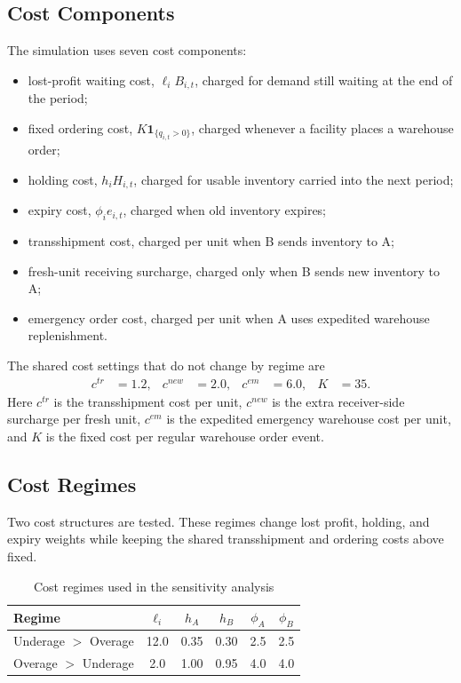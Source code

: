 \documentclass[11pt]{article}
\begin{document}
\subsection{Cost Components}
The simulation uses seven cost components:
\begin{itemize}[leftmargin=2em]
\item lost-profit waiting cost, $\ell_i B_{i,t}$, charged for demand still waiting at the end of the period;
\item fixed ordering cost, $K \mathbf{1}_{\{q_{i,t}>0\}}$, charged whenever a facility places a warehouse order;
\item holding cost, $h_i H_{i,t}$, charged for usable inventory carried into the next period;
\item expiry cost, $\phi_i e_{i,t}$, charged when old inventory expires;
\item transshipment cost, charged per unit when B sends inventory to A;
\item fresh-unit receiving surcharge, charged only when B sends new inventory to A;
\item emergency order cost, charged per unit when A uses expedited warehouse replenishment.
\end{itemize}
The shared cost settings that do not change by regime are
\begin{align*}
c^{tr} &= 1.2, &
c^{new} &= 2.0, &
c^{em} &= 6.0, &
K &= 35.
\end{align*}
Here $c^{tr}$ is the transshipment cost per unit, $c^{new}$ is the extra receiver-side surcharge per fresh unit, $c^{em}$ is the expedited emergency warehouse cost per unit, and $K$ is the fixed cost per regular warehouse order event.

\subsection{Cost Regimes}
Two cost structures are tested. These regimes change lost profit, holding, and expiry weights while keeping the shared transshipment and ordering costs above fixed.

\begin{table}[H]
\centering
\caption{Cost regimes used in the sensitivity analysis}
\label{tab:cost-regimes}
\begin{tabular}{lccccc}
\toprule
Regime & $\ell_i$ & $h_A$ & $h_B$ & $\phi_A$ & $\phi_B$ \\
\midrule
Underage $>$ Overage & 12.0 & 0.35 & 0.30 & 2.5 & 2.5 \\
Overage $>$ Underage & 2.0 & 1.00 & 0.95 & 4.0 & 4.0 \\
\bottomrule
\end{tabular}
\end{table}
\end{document}
